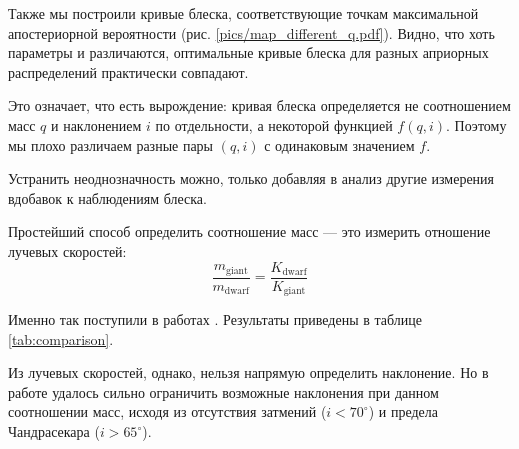 
Также мы построили кривые блеска, соответствующие точкам максимальной апостериорной вероятности (рис. \ref{pics/map_different_q.pdf}). Видно, что хоть параметры и различаются, оптимальные кривые блеска для разных априорных распределений практически совпадают.

Это означает, что есть вырождение: кривая блеска определяется не соотношением масс $q$ и наклонением $i$ по отдельности, а некоторой функцией $f(q,i)$. Поэтому мы плохо различаем разные пары $(q,i)$ с одинаковым значением $f$.

Устранить неоднозначность можно, только добавляя в анализ другие измерения вдобавок к наблюдениям блеска.





Простейший способ определить соотношение масс --- это измерить отношение лучевых скоростей:
\[
\frac{m_\text{giant}}{m_\text{dwarf}} = \frac{K_\text{dwarf}}{K_\text{giant}}
\]

Именно так поступили в работах \cite{Kraft, H_alpha}. Результаты приведены в таблице \ref{tab:comparison}.

Из лучевых скоростей, однако, нельзя напрямую определить наклонение. Но в работе \cite{H_alpha} удалось сильно ограничить возможные наклонения при данном соотношении масс, исходя из отсутствия затмений ($i < 70^\circ$) и предела Чандрасекара ($i > 65^\circ$).


